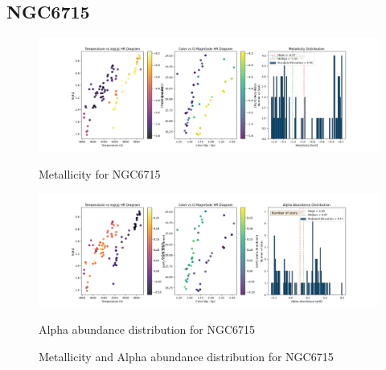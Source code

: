 \documentclass[a4paper,12pt]{article}
\begin{document}
\subsection{NGC6715}
\begin{figure}[H]
    \centering
    \begin{minipage}[b]{0.8\textwidth}
        \centering
        \includegraphics[width=\textwidth]{NGC6715_metalicity.png}
        \caption{Metallicity for NGC6715}
        \label{fig:NGC6715_metalicity}
    \end{minipage}
    \hfill
    \begin{minipage}[b]{0.8\textwidth}
        \centering
        \includegraphics[width=\textwidth]{NGC6715_alpha.png}
        \caption{Alpha abundance distribution for NGC6715}
        \label{fig:NGC6715_alpha}
    \end{minipage}
    \caption{Metallicity and Alpha abundance distribution for NGC6715}
    \label{fig:NGC6715_combined}
\end{figure}
\clearpage
\end{document}
